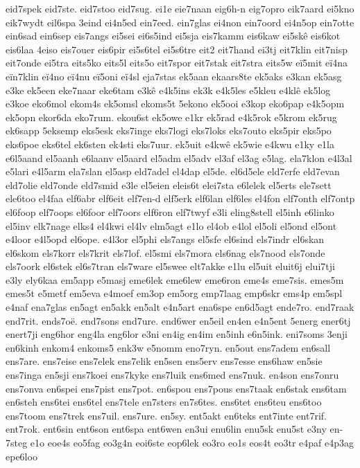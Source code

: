 eid7spek
eid7ste.
eid7stoo
eid7sug.
ei1e
eie7naan
eig6h-n
eig7opro
eik7aard
ei5kno
eik7wydt
eil6spa
3eind
ei4n5ed
ein7eed.
ein7glas
ei4non
ein7oord
ei4n5op
ein7otte
ein6sad
ein6sep
eis7angs
ei5sei
ei6s5ind
ei5sja
eis7kamm
eis6kaw
ei5skê
eis6kot
eis6laa
4eiso
eis7ouer
eis6pir
ei5s6tel
ei5s6tre
eit2
eit7hand
ei3tj
eit7klin
eit7nisp
eit7onde
ei5tra
eits5ko
eits5l
eits5o
eit7spor
eit7stak
eit7stra
eits5w
eï5mit
eï4na
eïn7klin
eï4no
eï4nu
eï5oni
eï4sl
eja7stas
ek5aan
ekaars8te
ek5aks
e3kan
ek5asg
e3ke
ek5een
eke7naar
eke6tam
e3kê
e4k5ins
ek3k
e4k5les
e5kleu
e4klê
ek5log
e3koe
eko6mol
ekom4s
ek5omsl
ekoms5t
5ekono
ek5ooi
e3kop
eko6pap
e4k5opm
ek5opn
ekor6da
eko7rum.
ekou6st
ek5owe
e1kr
ek5rad
e4k5rok
e5krom
ek5rug
ek6sapp
5eksemp
eks5esk
eks7inge
eks7logi
eks7loks
eks7outo
eks5pir
eks5po
eks6poe
eks6tel
ek6sten
ek4sti
eks7uur.
ek5uit
e4kwê
ek5wie
e4kwu
e1ky
e1la
e6l5aand
el5aanh
e6laanv
el5aard
el5adm
el5adv
el3af
el3ag
e5lag.
ela7klon
e4l3al
e5lari
e4l5arm
ela7slan
el5asp
eld7adel
el4dap
el5de.
el6d5ele
eld7erfe
eld7evan
eld7olie
eld7onde
eld7smid
e3le
el5eien
eleis6t
elei7sta
e6lelek
el5erts
ele7sett
ele6too
el4faa
elf6abr
elf6eit
elf7en-d
elf5erk
elf6lan
elf6les
el4fon
elf7onth
elf7ontp
el6foop
elf7oops
el6foor
elf7oors
elf6ron
elf7twyf
e3li
eling8stell
el5inh
e6linko
el5inv
elk7nage
elks4
el4kwi
el4lv
elm5agt
e1lo
el4ob
e4lol
el5oli
el5ond
el5ont
e4loor
e4l5opd
el6ope.
e4l3or
el5phi
els7angs
el5sfe
el6sind
els7indr
el6skan
el6skom
els7korr
els7krit
els7lof.
el5smi
els7mora
els6nag
els7nood
els7onde
els7oork
el6stek
el6s7tran
els7ware
el5swee
elt7akke
e1lu
el5uit
eluit6j
elui7tji
e3ly
ely6kaa
em5app
e5masj
eme6lek
eme6lew
eme6ron
eme4s
eme7sis.
emes5m
emes5t
e5metf
em5eva
e4moef
em3op
em5org
emp7laag
emp6skr
ems4p
em5spl
e4naf
ena7glas
en5agt
en5akk
en5alt
e4n5art
ena6spe
en6d5agt
ende7ro.
end7raak
end7rit.
ends7oë.
end7sons
end7ure.
end6wer
en5eil
en4en
e4n5ent
5energ
ener6tj
enert7ji
eng6hor
eng4la
eng6lor
e3ni
en4ig
en4im
en5inh
e6n5ink.
eni7soms
3enji
en6kinh
enkom4
enkoms5
enk3w
e5nomm
eno7ryn.
en5out
ens7adem
en6sall
ens7are.
ens7eise
ens7elek
ens7elik
en5sen
ens5erv
ens7esse
ens6haw
en5sie
ens7inga
en5sji
ens7koei
ens7kyke
ens7luik
ens6med
ens7nuk.
en4son
ens7onru
ens7onva
en6spei
ens7pist
ens7pot.
en6spou
ens7pous
ens7taak
en6stak
ens6tam
en6steh
ens6tei
ens6tel
ens7tele
en7sters
en7s6tes.
ens6tet
ens6teu
ens6too
ens7toom
ens7trek
ens7uil.
ens7ure.
en5sy.
ent5akt
en6teks
ent7inte
ent7rif.
ent7rok.
ent6sin
ent6son
ent6spa
ent6wen
en3ui
enu6lin
enu5sk
enu5st
e3ny
en-7steg
e1o
eoe4s
eo5fag
eo3g4n
eoi6ste
eop6lek
eo3ro
eo1s
eos4t
eo3tr
e4paf
e4p3ag
epe6loo
